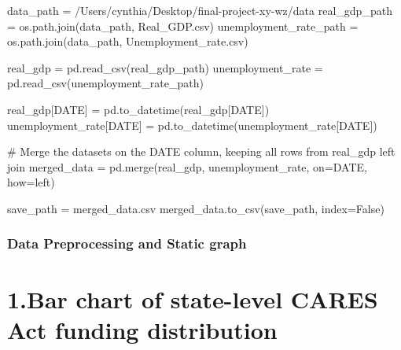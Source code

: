 \documentclass[
  letterpaper,
  DIV=11,
  numbers=noendperiod]{scrartcl}
\newenvironment{Shaded}{\begin{snugshade}}{\end{snugshade}}
\newcommand{\CommentTok}[1]{\textcolor[rgb]{0.37,0.37,0.37}{#1}}
\newcommand{\NormalTok}[1]{\textcolor[rgb]{0.00,0.23,0.31}{#1}}
\newcommand{\OperatorTok}[1]{\textcolor[rgb]{0.37,0.37,0.37}{#1}}
\newcommand{\StringTok}[1]{\textcolor[rgb]{0.13,0.47,0.30}{#1}}
\newcommand{\VariableTok}[1]{\textcolor[rgb]{0.07,0.07,0.07}{#1}}
\begin{document}
\begin{Shaded}
\begin{Highlighting}[]
\NormalTok{data\_path }\OperatorTok{=} \StringTok{\textquotesingle{}/Users/cynthia/Desktop/final{-}project{-}xy{-}wz/data\textquotesingle{}}
\NormalTok{real\_gdp\_path }\OperatorTok{=}\NormalTok{ os.path.join(data\_path, }\StringTok{\textquotesingle{}Real\_GDP.csv\textquotesingle{}}\NormalTok{)}
\NormalTok{unemployment\_rate\_path }\OperatorTok{=}\NormalTok{ os.path.join(data\_path, }\StringTok{\textquotesingle{}Unemployment\_rate.csv\textquotesingle{}}\NormalTok{)}

\NormalTok{real\_gdp }\OperatorTok{=}\NormalTok{ pd.read\_csv(real\_gdp\_path)}
\NormalTok{unemployment\_rate }\OperatorTok{=}\NormalTok{ pd.read\_csv(unemployment\_rate\_path)}

\NormalTok{real\_gdp[}\StringTok{\textquotesingle{}DATE\textquotesingle{}}\NormalTok{] }\OperatorTok{=}\NormalTok{ pd.to\_datetime(real\_gdp[}\StringTok{\textquotesingle{}DATE\textquotesingle{}}\NormalTok{])}
\NormalTok{unemployment\_rate[}\StringTok{\textquotesingle{}DATE\textquotesingle{}}\NormalTok{] }\OperatorTok{=}\NormalTok{ pd.to\_datetime(unemployment\_rate[}\StringTok{\textquotesingle{}DATE\textquotesingle{}}\NormalTok{])}

\CommentTok{\# Merge the datasets on the DATE column, keeping all rows from real\_gdp left join}
\NormalTok{merged\_data }\OperatorTok{=}\NormalTok{ pd.merge(real\_gdp, unemployment\_rate, on}\OperatorTok{=}\StringTok{\textquotesingle{}DATE\textquotesingle{}}\NormalTok{, how}\OperatorTok{=}\StringTok{\textquotesingle{}left\textquotesingle{}}\NormalTok{)}

\NormalTok{save\_path }\OperatorTok{=} \StringTok{\textquotesingle{}merged\_data.csv\textquotesingle{}}
\NormalTok{merged\_data.to\_csv(save\_path, index}\OperatorTok{=}\VariableTok{False}\NormalTok{)}
\end{Highlighting}
\end{Shaded}

\subsubsection{Data Preprocessing and Static
graph}\label{data-preprocessing-and-static-graph}

\section{1.Bar chart of state-level CARES Act funding
distribution}\label{bar-chart-of-state-level-cares-act-funding-distribution}
\end{document}
